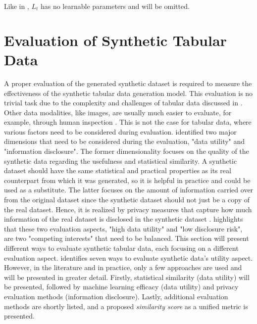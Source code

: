 Like in \cite{ho2020DenoisingDiffusionProbabilistic}, $L_{t}$ has no learnable parameters and will be omitted.

\section{Evaluation of Synthetic Tabular Data}
\label{ch:preliminaries-evaluationOfSyntheticTabularData}

A proper evaluation of the generated synthetic dataset is required to measure the effectiveness of the synthetic tabular data generation \gls{model}.
This evaluation is no trivial task due to the complexity and challenges of tabular data discussed in .
Other data modalities, like images, are usually much easier to evaluate, for example, through human inspection \cite{chundawat2022UniversalMetricRobust}. 
This is not the case for tabular data, where various factors need to be considered during evaluation.
\textcite[p. 6]{goncalves2020GenerationEvaluationSynthetic} identified two major dimensions that need to be considered during the evaluation, "data utility" and "information disclosure".
The former dimensionality focuses on the quality of the synthetic data regarding the usefulness and statistical similarity.
A synthetic dataset should have the same statistical and practical properties as its real counterpart from which it was generated, so it is helpful in practice and could be used as a substitute.
The latter focuses on the amount of information carried over from the original dataset since the synthetic dataset should not just be a copy of the real dataset.
Hence, it is realized by privacy measures that capture how much information of the real dataset is disclosed in the synthetic dataset \cite{goncalves2020GenerationEvaluationSynthetic}.
\textcite[p. 2]{little2021GenerativeAdversarialNetworksa} highlights that these two evaluation aspects, "high data utility" and "low disclosure risk", are two "competing interests" that need to be balanced.
This section will present different ways to evaluate synthetic tabular data, each focusing on a different evaluation aspect.
\textcite{elemam2020SevenWaysEvaluate} identifies seven ways to evaluate synthetic data's utility aspect.
However, in the literature and in practice, only a few approaches are used and will be presented in greater detail.
Firstly, statistical similarity (data utility) will be presented, followed by machine learning efficacy (data utility) and privacy evaluation methods (information disclosure).
Lastly, additional evaluation methods are shortly listed, and a proposed \textit{similarity score} as a unified metric is presented.

